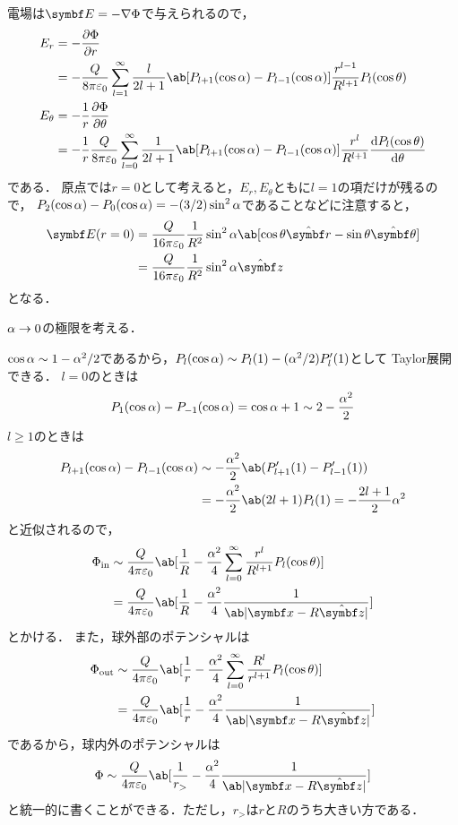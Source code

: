   電場は$\bs{E} = -\gr \Phi$で与えられるので，
  \begin{align}%
    E_r &= -\diffp{\Phi}{r} \notag\\
    &= -\frac{Q}{8\pi \eps_0}\sum_{l=1}^\infty
    \frac{l}{2l+1}\ab[P_{l+1}(\cos\alpha) - P_{l-1}(\cos\alpha)] 
    \frac{r^{l-1}}{R^{l+1}} P_l(\cos\theta)\\
    E_\theta &= -\frac{1}{r}\diffp{\Phi}{\theta} \notag\\
    &= -\frac{1}{r}\frac{Q}{8\pi\eps_0} 
    \sum_{l=0}^\infty \frac{1}{2l+1} \ab[P_{l+1}(\cos\alpha) - P_{l-1}(\cos\alpha)]\frac{r^l}{R^{l+1}} \diff{P_l(\cos\theta)}{\theta}
  \end{align}%
  である．
  原点では$r = 0$として考えると，$E_r, E_\theta$ともに$l=1$の項だけが残るので，
  $P_2(\cos\alpha) - P_0(\cos\alpha) = -(3/2)\sin^2\alpha$であることなどに注意すると，
  \begin{align}%
    \bs{E}(r=0) &= \frac{Q}{16\pi\eps_0}\frac{1}{R^2}\sin^2\alpha \ab[\cos\theta \hat{\bs{r}} - \sin\theta \hat{\bs{\theta}}] \notag\\
    &= \frac{Q}{16\pi \eps_0} \frac{1}{R^2}\sin^2\al \hat{\bs{z}}
  \end{align}%
  となる．

  $\alpha \to 0$の極限を考える．

  $\cos\alpha \sim 1 - \alpha^2 / 2$であるから，$P_l(\cos\alpha) \sim P_l(1) - (\alpha^2/2)P_l'(1)$として
  Taylor展開できる．
  $l = 0$のときは
  \begin{gather}%
    P_1(\cos\al) - P_{-1}(\cos\al) = \cos\al + 1 \sim 2 - \frac{\al^2}{2}
  \end{gather}%
  $l \geq 1$のときは
  \begin{align}%
    P_{l+1}(\cos\al) - P_{l-1}(\cos\al) 
    &\sim -\frac{\al^2}{2}\ab(P_{l+1}'(1) - P_{l-1}'(1))\notag\\
    &= -\frac{\al^2}{2}\ab(2l+1) P_l(1) = -\frac{2l+1}{2}\al^2
  \end{align}%
  と近似されるので，
  \begin{align}%
    \Phi_{\text{in}} &\sim 
    \frac{Q}{4\pi \eps_0} \ab[\frac{1}{R} 
    - \frac{\al^2}{4}\sum_{l=0}^\infty \frac{r^l}{R^{l+1}}P_l(\cos\theta)]\notag\\
    &= \frac{Q}{4\pi\eps_0}\ab[
      \frac{1}{R} - \frac{\al^2}{4} \frac{1}{\ab|\bs{x} - R\hat{\bs{z}}|}
    ]
  \end{align}%
  とかける．
  また，球外部のポテンシャルは
  \begin{align}%
    \Phi_{\text{out}} &\sim \frac{Q}{4\pi\eps_0}\ab[
      \frac{1}{r} - \frac{\al^2}{4} \sum_{l=0}^\infty \frac{R^l}{r^{l+1}}P_l(\cos\theta)
    ]\notag\\
    &= \frac{Q}{4\pi\eps_0} \ab[
      \frac{1}{r} - \frac{\al^2}{4} \frac{1}{\ab|\bs{x} - R\hat{\bs{z}}|}
    ]
  \end{align}%
  であるから，球内外のポテンシャルは
  \begin{gather}%
    \Phi \sim \frac{Q}{4\pi\eps_0} \ab[\frac{1}{r_>} - \frac{\al^2}{4}\frac{1}{\ab|\bs{x} - R \hat{\bs{z}}|}]
  \end{gather}%
  と統一的に書くことができる．ただし，$r_>$は$r$と$R$のうち大きい方である．

